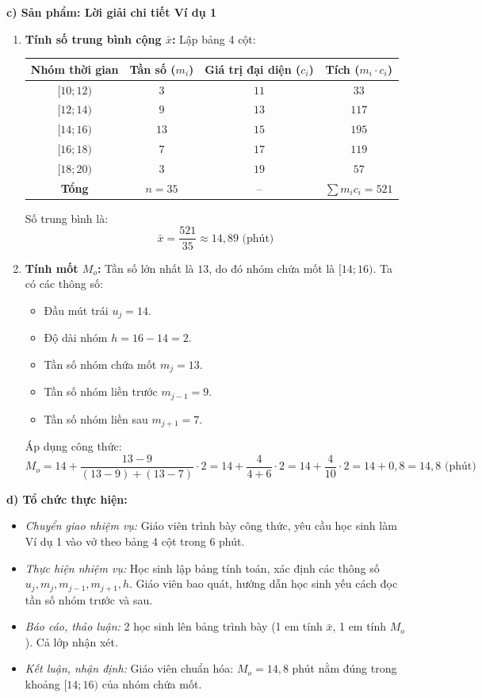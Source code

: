 \documentclass[12pt, a4paper]{article}
\begin{document}
\noindent \textbf{c) Sản phẩm: Lời giải chi tiết Ví dụ 1}
\begin{enumerate}[leftmargin=0.6cm]
    \item \textbf{Tính số trung bình cộng $\bar{x}$:}
    Lập bảng 4 cột:
    \begin{center}
    \small
    \begin{tabular}{|c|c|c|c|}
    \hline
    \textbf{Nhóm thời gian} & \textbf{Tần số ($m_i$)} & \textbf{Giá trị đại diện ($c_i$)} & \textbf{Tích ($m_i \cdot c_i$)} \\ \hline
    $[10; 12)$ & $3$ & $11$ & $33$ \\ \hline
    $[12; 14)$ & $9$ & $13$ & $117$ \\ \hline
    $[14; 16)$ & $13$ & $15$ & $195$ \\ \hline
    $[16; 18)$ & $7$ & $17$ & $119$ \\ \hline
    $[18; 20)$ & $3$ & $19$ & $57$ \\ \hline
    \textbf{Tổng} & $n = 35$ & -- & $\sum m_i c_i = 521$ \\ \hline
    \end{tabular}
    \end{center}
    Số trung bình là:
    $$\bar{x} = \dfrac{521}{35} \approx 14{,}89\text{ (phút)}$$

    \item \textbf{Tính mốt $M_o$:}
    Tần số lớn nhất là $13$, do đó nhóm chứa mốt là $[14; 16)$.
    Ta có các thông số:
    \begin{itemize}
        \item Đầu mút trái $u_j = 14$.
        \item Độ dài nhóm $h = 16 - 14 = 2$.
        \item Tần số nhóm chứa mốt $m_j = 13$.
        \item Tần số nhóm liền trước $m_{j-1} = 9$.
        \item Tần số nhóm liền sau $m_{j+1} = 7$.
    \end{itemize}
    Áp dụng công thức:
    $$M_o = 14 + \dfrac{13 - 9}{(13 - 9) + (13 - 7)} \cdot 2 = 14 + \dfrac{4}{4 + 6} \cdot 2 = 14 + \dfrac{4}{10} \cdot 2 = 14 + 0{,}8 = 14{,}8\text{ (phút)}$$
\end{enumerate}

\noindent \textbf{d) Tổ chức thực hiện:}
\begin{itemize}[leftmargin=0.8cm]
    \item \textit{Chuyển giao nhiệm vụ:} Giáo viên trình bày công thức, yêu cầu học sinh làm Ví dụ 1 vào vở theo bảng 4 cột trong 6 phút.
    \item \textit{Thực hiện nhiệm vụ:} Học sinh lập bảng tính toán, xác định các thông số $u_j, m_j, m_{j-1}, m_{j+1}, h$. Giáo viên bao quát, hướng dẫn học sinh yếu cách đọc tần số nhóm trước và sau.
    \item \textit{Báo cáo, thảo luận:} 2 học sinh lên bảng trình bày (1 em tính $\bar{x}$, 1 em tính $M_o$). Cả lớp nhận xét.
    \item \textit{Kết luận, nhận định:} Giáo viên chuẩn hóa: $M_o = 14{,}8$ phút nằm đúng trong khoảng $[14; 16)$ của nhóm chứa mốt.
\end{itemize}
\end{document}
